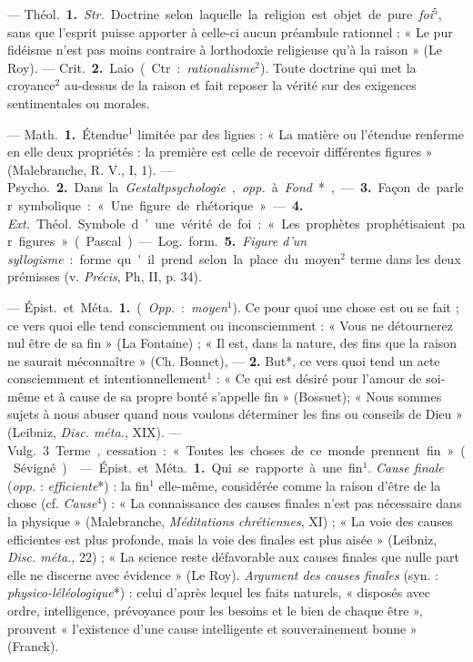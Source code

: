 \begin{itemize}[leftmargin=1cm, label=, itemsep=1pt]
 —  \si{Théol.} {\bf 1.} {\it Str.} Doctrine
selon laquelle la religion est objet
de pure {\it foi}$^5$, sans que l'esprit puisse
apporter à celle-ci aucun préambule rationnel : « Le pur fidéisme
n’est pas moins contraire à lorthodoxie religieuse qu'à la raison » (Le
Roy). — \si{Crit.} {\bf 2.} Laio (Ctr. : {\it rationalisme}$^2$).
Toute doctrine qui met la croyance$^2$ au-dessus de la raison
et fait reposer la vérité sur des exigences sentimentales ou morales.

 — \si{Math.} {\bf 1.} Étendue$^1$ limitée par des lignes : « La
matière ou l'étendue renferme en elle deux propriétés : la première est celle
de recevoir différentes figures » (Malebranche, R. V., I, 1). — \si{Psycho.}
{\bf 2.} Dans la {\it Gestaltpsychologie}, {\it opp.} à {\it Fond}*, — {\bf 3.}
Façon de parler symbolique : « Une figure de rhétorique ». — {\bf 4.} {\it
Ext.} \si{Théol.} Symbole d’une vérité de foi : « Les prophètes prophétisaient
par figures » (Pascal).

— \si{Log.} \si{form.} {\bf 5.} {\it Figure d’un syllogisme} : forme qu'il
prend selon la place du moyen$^2$ terme dans les deux prémisses
(v. {\it Précis}, Ph, II, p. 34).

 — \si{Épist.} et \si{Méta.} {\bf 1.} ({\it Opp.} : {\it moyen}$^1$).
Ce pour quoi une chose est ou se fait ; ce vers quoi elle tend consciemment
ou inconsciemment : « Vous ne détournerez nul être de sa fin » (La
Fontaine) ; « Il est, dans la nature, des fins que la raison ne saurait
méconnaître » (Ch. Bonnet), — {\bf 2.} But*, ce vers quoi tend un
acte consciemment et intentionnellement$^1$ : « Ce qui est désiré pour
l'amour de soi-même et à cause de
sa propre bonté s’appelle fin » (Bossuet); « Nous sommes sujets à nous
abuser quand nous voulons déterminer les fins ou conseils de Dieu »
(Leibniz, {\it Disc. méta.}, XIX). — \si{Vulg.} 3 Terme, cessation :
« Toutes les choses de ce monde prennent fin » (Sévigné).

 — \si{Épist.} et \si{Méta.} {\bf 1.} Qui se rapporte à une fin$^1$.
{\it Cause finale} ({\it opp.} : {\it efficiente}*) : la fin$^1$ elle-même,
considérée comme la raison d’être de la chose (cf. {\it Cause}$^4$) : « La
connaissance des causes finales n’est pas nécessaire dans la physique »
(Malebranche, {\it Méditations chrétiennes}, XI) ; « La voie des causes
efficientes est plus profonde, mais la voie des finales est plus aisée »
(Leibniz, {\it Disc. méta.}, 22) ; « La science reste défavorable aux causes
finales que nulle part elle ne discerne avec évidence » (Le Roy).
{\it Argument des causes finales} (syn. : {\it physico-léléologique}*) :
celui d’après lequel les faits naturels, « disposés avec ordre, intelligence,
prévoyance pour les besoins et le bien de chaque être », prouvent
« l'existence d’une cause intelligente et souverainement bonne » (Franck).


\end{itemize}
